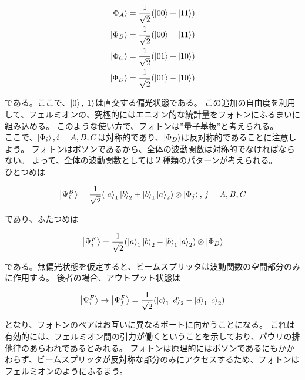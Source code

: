 \documentclass[a4paper,11pt]{jsarticle}
\numberwithin{equation}{section}
\begin{document}
\begin{align}
\ket{\Phi_A}=\frac{1}{\sqrt{2}}(\ket{00}+\ket{11})\\
\ket{\Phi_B}=\frac{1}{\sqrt{2}}(\ket{00}-\ket{11})\\
\ket{\Phi_C}=\frac{1}{\sqrt{2}}(\ket{01}+\ket{10})\\
\ket{\Phi_D}=\frac{1}{\sqrt{2}}(\ket{01}-\ket{10})\\
\end{align}

である。ここで、$\ket{0},\ket{1}$は直交する偏光状態である。
この追加の自由度を利用して、フェルミオンの、究極的にはエニオン的な統計量をフォトンにふるまいに組み込める。
このような使い方で、フォトンは”量子基板”と考えられる。\\
ここで、$\ket{\Phi_i},i=A,B,C$は対称的であり、$\ket{\Phi_D}$は反対称的であることに注意しよう。
フォトンはボソンであるから、全体の波動関数は対称的でなければならない。
よって、全体の波動関数としては２種類のパターンが考えられる。\\
ひとつめは

\begin{align}
  \ket{\Psi_i^B}=\frac{1}{\sqrt{2}}(\ket{a}_1\ket{b}_2+\ket{b}_1\ket{a}_2)\otimes\ket{\Phi_j},\,j=A,B,C
\end{align}

であり、ふたつめは

\begin{align}
  \ket{\Psi_i^F}=\frac{1}{\sqrt{2}}(\ket{a}_1\ket{b}_2-\ket{b}_1\ket{a}_2)\otimes\ket{\Phi_D}
\end{align}

である。無偏光状態を仮定すると、ビームスプリッタは波動関数の空間部分のみに作用する。
後者の場合、アウトプット状態は

\begin{align}
  \ket{\Psi_i^F}\to\ket{\Psi_f^F}=\frac{1}{\sqrt{2}}(\ket{c}_1\ket{d}_2-\ket{d}_1\ket{c}_2)
\end{align}

となり、フォトンのペアはお互いに異なるポートに向かうことになる。
これは有効的には、フェルミオン間の引力が働くということを示しており、パウリの排他律のあらわれであるとみれる。
フォトンは原理的にはボソンであるにもかかわらず、ビームスプリッタが反対称な部分のみにアクセスするため、フォトンはフェルミオンのようにふるまう。
\end{document}
